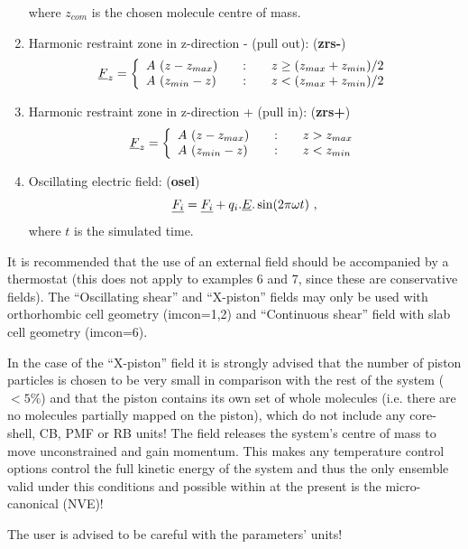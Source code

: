 \begin{enumerate}
\begin{equation}
\end{equation}
where $z_{com}$ is the chosen molecule centre of mass.
\item Harmonic restraint zone in z-direction - (pull out): ({\bf zrs-})
\begin{equation}
\vek{F}_{z} = \left\{ \begin{array} {l@{\qquad:\qquad}l}
A~(z-z_{max}) & z \ge (z_{max}+z_{min})/2 \\
A~(z_{min}-z) & z < (z_{max}+z_{min})/2
\end{array} \right.
\end{equation}
\item Harmonic restraint zone in z-direction + (pull in): ({\bf zrs+})
\begin{equation}
\vek{F}_{z} = \left\{ \begin{array} {l@{\qquad:\qquad}l}
A~(z-z_{max}) & z > z_{max} \\
A~(z_{min}-z) & z < z_{min}
\end{array} \right.
\end{equation}
\item Oscillating electric field:  ({\bf osel})
\begin{equation}
\mbox{$\underline{F_{i}}$} = \mbox{$\underline{F_{i}}$} + q_{i} . \mbox{$\underline{E}$} . \sin(2 \pi \omega t)~,
\end {equation}
where $t$ is the simulated time.
\end{enumerate}
It is recommended that the use of an external field should be
accompanied by a thermostat (this does not apply
to examples 6 and 7, since these are conservative fields).  The
``Oscillating shear'' and ``X-piston'' fields may only be used with
orthorhombic cell geometry (imcon=1,2) and ``Continuous shear'' field
with slab cell geometry (imcon=6).

In the case of the ``X-piston'' field it is strongly advised that the
number of piston particles is chosen to be very small in comparison
with the rest of the system ($< 5\%$) and that the piston contains
its own set of whole molecules (i.e. there are no molecules partially
mapped on the piston), which do not include any core-shell, CB, PMF
or RB units!  The field releases the system's centre of mass to move
unconstrained and gain momentum.  This makes any temperature control
options control the full kinetic energy of the system and thus the
only ensemble valid under this conditions and possible within \D at
the present is the micro-canonical (NVE)!

The user is advised to be careful with the parameters' units!

